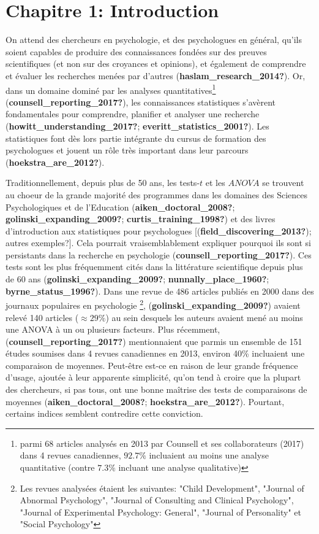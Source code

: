 \documentclass[
  english,
  man]{apa6}
\author{\phantom{0}}
\date{}
\affiliation{\phantom{0}}
\begin{document}


\hypertarget{chapitre-1-introduction}{%
\section{Chapitre 1: Introduction}\label{chapitre-1-introduction}}

On attend des chercheurs en psychologie, et des psychologues en général, qu'ils soient capables de produire des connaissances fondées sur des preuves scientifiques (et non sur des croyances et opinions), et également de comprendre et évaluer les recherches menées par d'autres (\textbf{haslam\_research\_2014?}). Or, dans un domaine dominé par les analyses quantitatives\footnote{parmi 68 articles analysés en 2013 par Counsell et ses collaborateurs (2017) dans 4 revues canadiennes, $92.7 \%$ incluaient au moins une analyse quantitative (contre $7.3 \%$ incluant une analyse qualitative)} (\textbf{counsell\_reporting\_2017?}), les connaissances statistiques s'avèrent fondamentales pour comprendre, planifier et analyser une recherche (\textbf{howitt\_understanding\_2017?}; \textbf{everitt\_statistics\_2001?}). Les statistiques font dès lors partie intégrante du cursus de formation des psychologues et jouent un rôle très important dans leur parcours (\textbf{hoekstra\_are\_2012?}).

Traditionnellement, depuis plus de 50 ans, les tests-\(t\) et les \(ANOVA\) se trouvent au choeur de la grande majorité des programmes dans les domaines des Sciences Psychologiques et de l'Education (\textbf{aiken\_doctoral\_2008?}; \textbf{golinski\_expanding\_2009?}; \textbf{curtis\_training\_1998?}) et des livres d'introduction aux statistiques pour psychologues {[}(\textbf{field\_discovering\_2013?}); autres exemples?{]}. Cela pourrait vraisemblablement expliquer pourquoi ils sont si persistants dans la recherche en psychologie (\textbf{counsell\_reporting\_2017?}). Ces tests sont les plus fréquemment cités dans la littérature scientifique depuis plus de 60 ans (\textbf{golinski\_expanding\_2009?}; \textbf{nunnally\_place\_1960?}; \textbf{byrne\_status\_1996?}). Dans une revue de 486 articles publiés en 2000 dans des journaux populaires en psychologie \footnote{Les revues analysées étaient les suivantes: "Child Development", "Journal of Abnormal Psychology", "Journal of Consulting and Clinical Psychology", "Journal of Experimental Psychology: General", "Journal of Personality" et "Social Psychology"}, (\textbf{golinski\_expanding\_2009?}) avaient relevé 140 articles (\(\approx 29 \%\)) au sein desquels les auteurs avaient mené au moins une ANOVA à un ou plusieurs facteurs. Plus récemment, (\textbf{counsell\_reporting\_2017?}) mentionnaient que parmis un ensemble de 151 études soumises dans 4 revues canadiennes en 2013, environ 40\% incluaient une comparaison de moyennes. Peut-être est-ce en raison de leur grande fréquence d'usage, ajoutée à leur apparente simplicité, qu'on tend à croire que la plupart des chercheurs, si pas tous, ont une bonne maîtrise des tests de comparaisons de moyennes (\textbf{aiken\_doctoral\_2008?}; \textbf{hoekstra\_are\_2012?}). Pourtant, certains indices semblent contredire cette conviction.
\end{document}
